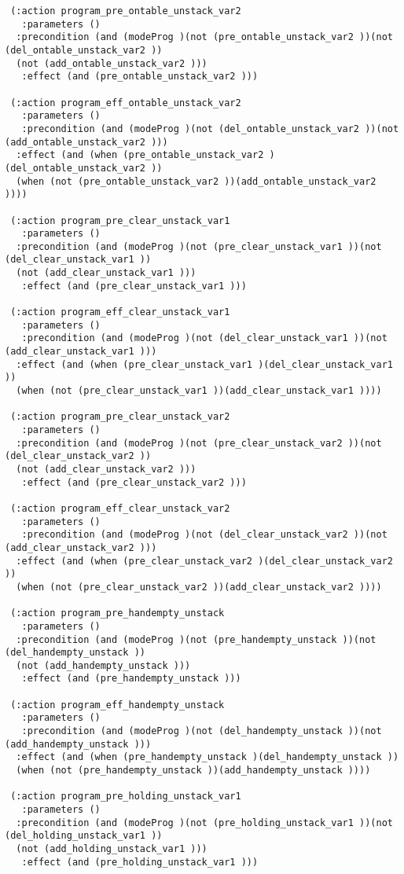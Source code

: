 \begin{scriptsize}
\begin{verbatim}
 (:action program_pre_ontable_unstack_var2
   :parameters ()
  :precondition (and (modeProg )(not (pre_ontable_unstack_var2 ))(not (del_ontable_unstack_var2 ))
  (not (add_ontable_unstack_var2 )))
   :effect (and (pre_ontable_unstack_var2 )))

 (:action program_eff_ontable_unstack_var2
   :parameters ()
   :precondition (and (modeProg )(not (del_ontable_unstack_var2 ))(not (add_ontable_unstack_var2 )))
  :effect (and (when (pre_ontable_unstack_var2 )(del_ontable_unstack_var2 ))
  (when (not (pre_ontable_unstack_var2 ))(add_ontable_unstack_var2 ))))

 (:action program_pre_clear_unstack_var1
   :parameters ()
  :precondition (and (modeProg )(not (pre_clear_unstack_var1 ))(not (del_clear_unstack_var1 ))
  (not (add_clear_unstack_var1 )))
   :effect (and (pre_clear_unstack_var1 )))

 (:action program_eff_clear_unstack_var1
   :parameters ()
   :precondition (and (modeProg )(not (del_clear_unstack_var1 ))(not (add_clear_unstack_var1 )))
  :effect (and (when (pre_clear_unstack_var1 )(del_clear_unstack_var1 ))
  (when (not (pre_clear_unstack_var1 ))(add_clear_unstack_var1 ))))

 (:action program_pre_clear_unstack_var2
   :parameters ()
  :precondition (and (modeProg )(not (pre_clear_unstack_var2 ))(not (del_clear_unstack_var2 ))
  (not (add_clear_unstack_var2 )))
   :effect (and (pre_clear_unstack_var2 )))

 (:action program_eff_clear_unstack_var2
   :parameters ()
   :precondition (and (modeProg )(not (del_clear_unstack_var2 ))(not (add_clear_unstack_var2 )))
  :effect (and (when (pre_clear_unstack_var2 )(del_clear_unstack_var2 ))
  (when (not (pre_clear_unstack_var2 ))(add_clear_unstack_var2 ))))

 (:action program_pre_handempty_unstack
   :parameters ()
  :precondition (and (modeProg )(not (pre_handempty_unstack ))(not (del_handempty_unstack ))
  (not (add_handempty_unstack )))
   :effect (and (pre_handempty_unstack )))

 (:action program_eff_handempty_unstack
   :parameters ()
   :precondition (and (modeProg )(not (del_handempty_unstack ))(not (add_handempty_unstack )))
  :effect (and (when (pre_handempty_unstack )(del_handempty_unstack ))
  (when (not (pre_handempty_unstack ))(add_handempty_unstack ))))

 (:action program_pre_holding_unstack_var1
   :parameters ()
  :precondition (and (modeProg )(not (pre_holding_unstack_var1 ))(not (del_holding_unstack_var1 ))
  (not (add_holding_unstack_var1 )))
   :effect (and (pre_holding_unstack_var1 )))


\end{verbatim}
\end{scriptsize}
